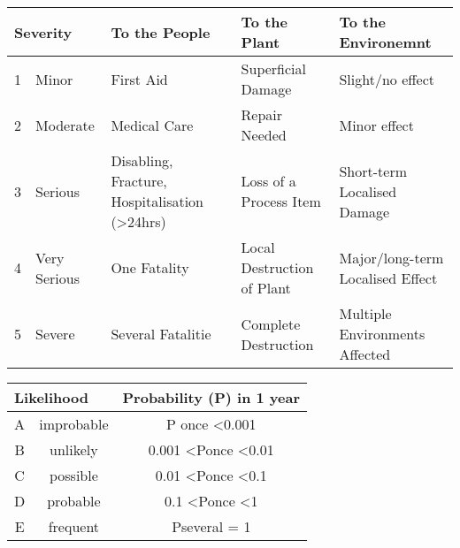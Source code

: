 \begin{tabularx}{\linewidth}{@{}llXXX@{}}
\toprule
\multicolumn{2}{l}{\textbf{Severity}} & \textbf{To the People}                                     & \textbf{To the Plant}      & \textbf{To the Environemnt}      \\ \midrule
1          & Minor             & First Aid                                                  & Superficial Damage         & Slight/no effect                 \\
2          & Moderate          & Medical Care                                               & Repair Needed              & Minor effect                     \\
3          & Serious           & Disabling, Fracture, Hospitalisation (\textgreater{}24hrs) & Loss of a Process Item     & Short-term Localised Damage      \\
4          & Very Serious      & One Fatality                                               & Local Destruction of Plant & Major/long-term Localised Effect \\
5          & Severe            & Several Fatalitie                                          & Complete Destruction       & Multiple Environments Affected   \\ \bottomrule
\end{tabularx}

\begin{tabular}{@{}ccc@{}}
\toprule
\multicolumn{2}{l}{Likelihood} & Probability (P) in 1 year              \\ \midrule
A & improbable & P once \textless   0.001               \\
B & unlikely   & 0.001 \textless Ponce   \textless 0.01 \\
C & possible   & 0.01 \textless Ponce   \textless 0.1   \\
D & probable   & 0.1 \textless Ponce   \textless 1      \\
E & frequent   & Pseveral   = 1                         \\ \bottomrule
\end{tabular}


